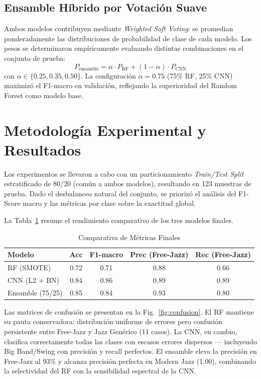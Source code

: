 \documentclass[conference]{IEEEtran}
\begin{document}
\subsection{Ensamble Híbrido por Votación Suave}
Ambos modelos contribuyen mediante \textit{Weighted Soft Voting}: se promedian ponderadamente las distribuciones de probabilidad de clase de cada modelo. Los pesos se determinaron empíricamente evaluando distintas combinaciones en el conjunto de prueba:
\begin{equation}
P_{\text{ensamble}} = \alpha \cdot P_{\text{RF}} + (1 - \alpha) \cdot P_{\text{CNN}}
\label{eq:ensemble}
\end{equation}
con $\alpha \in \{0.25, 0.35, 0.50\}$. La configuración $\alpha = 0.75$ (75\% RF, 25\% CNN) maximizó el F1-macro en validación, reflejando la superioridad del Random Forest como modelo base.

\section{Metodología Experimental y Resultados}

Los experimentos se llevaron a cabo con un particionamiento \textit{Train/Test Split} estratificado de 80/20 (común a ambos modelos), resultando en 123 muestras de prueba. Dado el desbalanceo natural del conjunto, se priorizó el análisis del F1-Score macro y las métricas por clase sobre la exactitud global.

La Tabla~\ref{tab:resultados} resume el rendimiento comparativo de los tres modelos finales.

\begin{table}[htbp]
\centering
\caption{Comparativa de Métricas Finales}
\label{tab:resultados}
\begin{tabular}{@{}lcccc@{}}
\toprule
\textbf{Modelo} & \textbf{Acc} & \textbf{F1-macro} & \textbf{Prec (Free-Jazz)} & \textbf{Rec (Free-Jazz)} \\ \midrule
RF (SMOTE)          & 0.72 & 0.71 & 0.88 & 0.66 \\
CNN (L2 + BN) & 0.84 & 0.86 & 0.89 & 0.89 \\
Ensamble (75/25)    & 0.85 & 0.84 & 0.93 & 0.80 \\ \bottomrule
\end{tabular}
\end{table}

Las matrices de confusión se presentan en la Fig.~\ref{fig:confusion}. El RF mantiene su pauta conservadora: distribución uniforme de errores pero confusión persistente entre Free-Jazz y Jazz Genérico (11 casos). La CNN, en cambio, clasifica correctamente todas las clases con escasos errores dispersos — incluyendo Big Band/Swing con precisión y recall perfectos. El ensamble eleva la precisión en Free-Jazz al 93\% y alcanza precisión perfecta en Modern Jazz (1.00), combinando la selectividad del RF con la sensibilidad espectral de la CNN.
\end{document}
